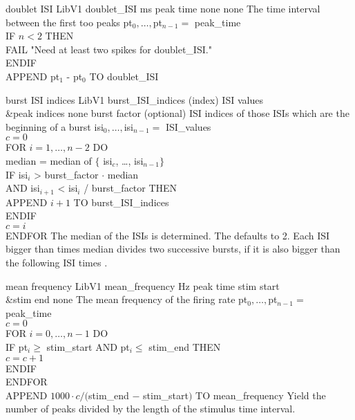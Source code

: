 \begin{efeature}
  {doublet ISI}
  {LibV1}
  {doublet\_ISI}
  {ms}
  {peak time}
  {none}
  {none}
  {The time interval between the first too peaks}
  { 
  pt$_0, \ldots, $pt$_{n-1} =$ peak\_time \\
  IF $n < 2$ THEN \+ \\
    FAIL "Need at least two spikes for doublet\_ISI." \- \\
  ENDIF \\
  APPEND pt$_1$ - pt$_0$ TO doublet\_ISI \\
  }
  
\end{efeature}

\begin{efeature}
  {burst ISI indices}
  {LibV1}
  {burst\_ISI\_indices}
  {(index)}
  {ISI values\\&peak indices}
  {none}
  {burst factor (optional)}
  {ISI indices of those ISIs which are the beginning of a burst}
  {
  isi$_0, \ldots, $isi$_{n-1} =$ ISI\_values \\
  $c = 0$ \\
  FOR $i = 1, \dots, n - 2$ DO \+ \\
    median = median of $\{$ isi$_c$, \ldots, isi$_{n-1}\}$ \\
    IF isi$_i$ > burst\_factor $\cdot$ median \\
    AND isi$_{i+1}$ < isi$_i$ / burst\_factor THEN \+ \\
      APPEND $i+1$ TO burst\_ISI\_indices \- \\
    ENDIF \\
    $c = i$ \- \\
  ENDFOR
  }
  The median of the ISIs is determined.
  The  defaults to 2.
  Each ISI bigger than  times median divides two successive bursts, if it is also bigger than the following ISI times .
  
\end{efeature}

\begin{efeature}
  {mean frequency}
  {LibV1}
  {mean\_frequency}
  {Hz}
  {peak time}
  {stim start\\&stim end}
  {none}
  {The mean frequency of the firing rate}
  {
  pt$_0, \ldots, $pt$_{n-1} =$ peak\_time \\
  $c = 0$ \\
  FOR $i = 0, \dots, n - 1$ DO \+ \\
    IF pt$_i \ge$ stim\_start AND pt$_i \le$ stim\_end THEN \+ \\
      $c = c + 1$ \- \\
    ENDIF \- \\
  ENDFOR \\
  APPEND $1000 \cdot c / ($stim\_end $-$ stim\_start$)$ TO mean\_frequency
  }
  Yield the number of peaks divided by the length of the stimulus time interval.
\end{efeature}

